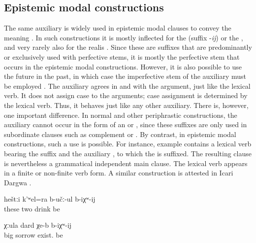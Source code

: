 
\subsection{Epistemic modal constructions}
\label{ssec:Epistemic modal constructions}

The same auxiliary is widely used in epistemic modal clauses to convey the meaning . In such constructions it is mostly inflected for the  (suffix -\textit{ij})  or the   , and very rarely also for the realis   . Since these are suffixes that are predominantly or exclusively used with perfective stems, it is mostly the perfective stem  that occurs in the epistemic modal constructions. However, it is also possible to use the future in the past, in which case the imperfective stem of the auxiliary must be employed . The auxiliary agrees in  and  with the  argument, just like the lexical verb. It does not assign case to the arguments; case assignment is determined by the lexical verb. Thus, it behaves just like any other auxiliary. There is, however, one important difference. In normal  and other periphrastic constructions, the auxiliary cannot occur in the form of an  or , since these suffixes are only used in subordinate clauses such as complement or . By contrast, in epistemic modal constructions, such a use is possible. For instance, example  contains a lexical verb bearing the  suffix and the auxiliary , to which the  is suffixed. The resulting clause is nevertheless a grammatical independent main clause. The lexical verb appears in a finite or non-finite verb form. A similar construction is attested in Icari Dargwa \citep[110]{Sumbatova.Mutalov2003}.
%
\begin{exe}
	\ex	\label{ex:These two are probably drinking}
	\gll	heštːi	k'ʷel=ra	b-učː-ul	b-iχʷ-ij\\
		these	two	drink	be\\
	\glt	{}

	\ex	\label{ex:(He) probably has big sorrows}
	\gll	χːula	dard	χe-b	b-iχʷ-ij\\
		big	sorrow	exist.		be\\
	\glt	{}
\end{exe}

